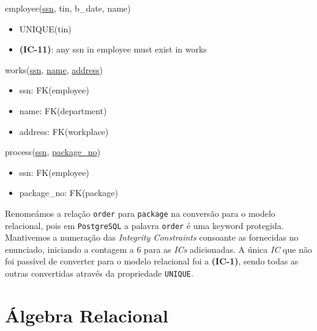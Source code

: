 \documentclass[12pt,a4paper]{article}
\begin{document}
  \vspace*{10pt}
  \noindent
  employee(\underline{ssn}, tin, b\_date, name)
  \begin{itemize}[nosep]
      \item UNIQUE(tin)
      \item \textsf{\textbf{(IC-11)}}: any ssn in employee \textsf{must exist} in works
  \end{itemize}

  \vspace*{10pt}
  \noindent
  works(\underline{ssn}, \underline{name}, \underline{address})
  \begin{itemize}[nosep]
      \item ssn: FK(employee)
      \item name: FK(department)
      \item address: FK(workplace)
  \end{itemize}

  \vspace*{10pt}
  \noindent
  process(\underline{ssn}, \underline{package\_no})
  \begin{itemize}[nosep]
      \item ssn: FK(employee)
      \item package\_no: FK(package)
  \end{itemize}
  \sffamily

  \vspace*{10pt}
  \noindent
  Renomeámos a relação \texttt{order} para \texttt{package} na conversão para o modelo relacional, pois em \texttt{PostgreSQL} a palavra \texttt{order} é uma keyword protegida.
  Mantivemos a numeração das \textit{Integrity Constraints} consoante as fornecidas no enunciado, iniciando a contagem a 6 para as \textit{ICs} adicionadas.
  A única \textit{IC} que não foi passível de converter para o modelo relacional foi a \textbf{(IC-1)}, sendo todas as outras convertidas através da propriedade \texttt{UNIQUE}.

  \section*{Álgebra Relacional}
\end{document}
